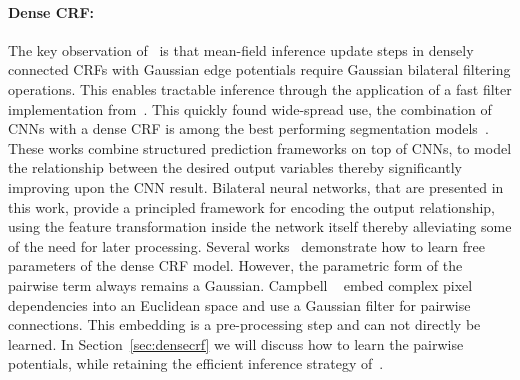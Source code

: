 \paragraph{Dense CRF:} The key observation of~\cite{krahenbuhl2012efficient} is
that mean-field inference update steps in densely connected CRFs with Gaussian
edge potentials require Gaussian bilateral filtering operations. This enables
tractable inference through the application of a fast filter implementation
from~\cite{adams2010fast}. This quickly found wide-spread use, \eg the combination of CNNs with
a dense CRF is among the best performing segmentation
models~\cite{chen2014semantic, zheng2015conditional, bell2015minc}. These works
combine structured prediction frameworks on top of CNNs, to model the
relationship between the desired output variables thereby significantly
improving upon the CNN result. Bilateral neural networks, that are presented in
this work, provide a principled framework for encoding the output relationship,
using the feature transformation inside the network itself thereby alleviating
some of the need for later processing. Several works~\cite{krahenbuhl2013parameter,
domke2013learning,kiefel2014human,zheng2015conditional,schwing2015fully} demonstrate how to learn free parameters of
the dense CRF model. However, the parametric form of the pairwise term always remains a
Gaussian. Campbell \etal~\cite{campbell2013fully} embed complex pixel
dependencies into an Euclidean space and use a Gaussian filter for pairwise connections.
This embedding is a pre-processing step and can not directly be learned. In
Section~\ref{sec:densecrf} we will discuss how to learn the pairwise
potentials, while retaining the efficient inference strategy of~\cite{krahenbuhl2012efficient}.


